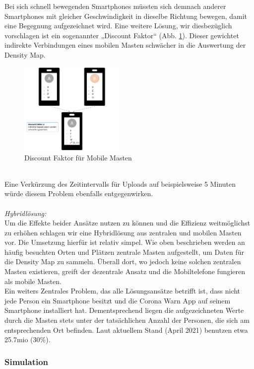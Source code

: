 \documentclass[conference]{IEEEtran}
\begin{document}
Bei sich schnell bewegenden Smartphones müssten sich demnach anderer Smartphones mit gleicher Geschwindigkeit in dieselbe Richtung bewegen, damit eine Begegnung aufgezeichnet wird. 
Eine weitere Lösung, wir diesbezüglich vorschlagen ist ein sogenannter „Discount Faktor“ (Abb. \ref{disc_factor}). 
Dieser gewichtet indirekte Verbindungen eines mobilen Masten schwächer in die Auswertung der Density Map. \\
\begin{figure}[h]
	\centering
	\includegraphics[width=0.45\textwidth]{"Discount_Faktor"}
	\caption{Discount Faktor für Mobile Masten}
	\label{disc_factor}
\end{figure} \\
Eine Verkürzung des Zeitintervalls für Uploads auf beispielsweise 5 Minuten würde diesem Problem ebenfalls entgegenwirken.  \\
\\
\textit{Hybridlösung:}\\
Um die Effekte beider Ansätze nutzen zu können und die Effizienz weitmöglichst zu erhöhen schlagen wir eine Hybridlösung aus zentralen und mobilen Masten vor. 
Die Umsetzung hierfür ist relativ simpel. Wie oben beschrieben werden an häufig besuchten Orten und Plätzen zentrale Masten aufgestellt, um Daten für die Density Map zu sammeln. 
Überall dort, wo jedoch keine solchen zentralen Masten existieren, greift der dezentrale Ansatz und die Mobiltelefone fungieren als mobile Masten. \\
Ein weiters Zentrales Problem, das alle Lösungsansätze betrifft ist, dass nicht jede Person ein Smartphone besitzt und die  Corona Warn App auf seinem Smartphone installiert hat. 
Dementsprechend liegen die aufgezeichneten Werte durch die Masten stets unter der tatsächlichen Anzahl der Personen, die sich am entsprechenden Ort befinden. Laut aktuellem Stand (April 2021) benutzen etwa 25.7mio (30\%). \\

\subsubsection{Simulation}
\end{document}
